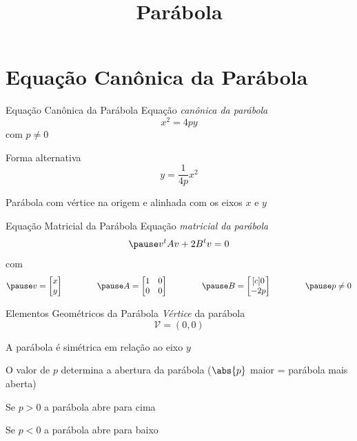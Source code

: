 \documentclass[fleqn,aspectratio=169,12pt]{beamer}
\title{Parábola}
\begin{document}
\addtitle

\section{Equação Canônica da Parábola}

\begin{frame}{Equação Canônica da Parábola}
  Equação \emph{canônica da parábola}
  \[
    x^2 = 4py
  \]
  com \(p \neq 0\)

  \pause
  \bigskip
  Forma alternativa
  \[
    y = \frac{1}{4p} x^2
  \]

  \pause
  \medskip
  Parábola com vértice na origem e alinhada com os eixos $x$ e $y$
\end{frame}

\begin{frame}{Equação Matricial da Parábola}
  Equação \emph{matricial da parábola}
  \[
    \pause
    v^tAv + 2B^tv = 0
  \]
  \pause
  com
  \[
    \pause
    v = \begin{bmatrix}
      x \\
      y
    \end{bmatrix}
    \qquad\qquad
    \pause
    A = \begin{bmatrix}
      1 & 0 \\
      0 & 0
    \end{bmatrix}
    \qquad\qquad
    \pause
    B = \begin{bmatrix}[c]
      0   \\
      -2p
    \end{bmatrix}
    \qquad\qquad
    \pause
    p \neq 0
  \]
\end{frame}

\begin{frame}{Elementos Geométricos da Parábola}
  \emph{Vértice} da parábola
  \[
    \mathcal{V}  = (0, 0)
  \]

  \pause
  A parábola é simétrica em relação ao eixo $y$

  \pause
  O valor de $p$ determina a abertura da parábola
  ($\abs{p}$ maior = parábola mais aberta)

  \pause
  Se \(p > 0\) a parábola abre para cima

  \pause
  Se \(p < 0 \) a parábola abre para baixo
\end{frame}
\end{document}
